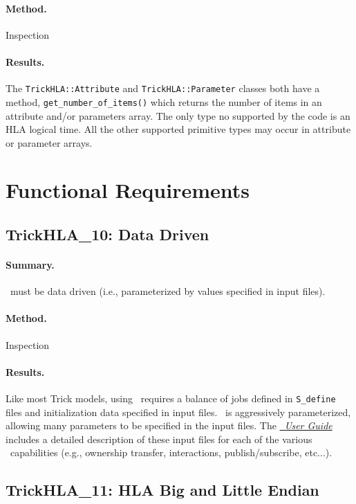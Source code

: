 \paragraph{Method.} Inspection
\paragraph{Results.}
The {\tt TrickHLA::Attribute} and {\tt TrickHLA::Parameter} classes
both have a method, {\tt get\_\-number\_\-of\_\-items()} which returns
the number of items in an attribute and/or parameters array.
The only type no supported by the code is an HLA logical time.
All the other supported primitive types may occur in attribute or
parameter arrays.

\section{Functional Requirements}

\subsection{TrickHLA\_10: Data Driven}
\paragraph{Summary.}
\TrickHLA\ must be data driven (i.e., parameterized by values
specified in input files).
\paragraph{Method.} Inspection
\paragraph{Results.}
Like most Trick models, using \TrickHLA\ requires a balance of
jobs defined in {\tt S\_define} files and initialization data
specified in input files.
\TrickHLA\ is aggressively parameterized, allowing many parameters
to be specified in the input files.
The \href{file:TrickHLAUser.pdf} {\em \TrickHLA\ User Guide}
includes a detailed description of these input files
for each of the various \TrickHLA\ capabilities
(e.g., ownership transfer, interactions, publish/subscribe, etc...).

\subsection{TrickHLA\_11: HLA Big and Little Endian}
